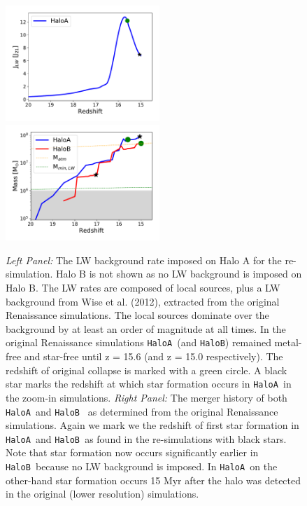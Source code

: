\documentclass[graphics, twocolumn, usenatbib]{mn2e}
\newcommand{\ha} {\texttt{HaloA~}}
\newcommand{\hb} {\texttt{HaloB~}}
\begin{document}
\begin{figure}
\centering
\begin{minipage}{175mm}      \begin{center} 
\centerline{
\includegraphics[width=0.52\textwidth]{FIGURES/Combined.pdf}
\includegraphics[width=0.52\textwidth]{FIGURES/MassRedshift.pdf}}
\caption{\textit{Left Panel:} The LW background rate imposed on Halo A for the re-simulation. Halo B is not shown
  as no LW background is imposed on Halo B. The LW rates
  are composed of local sources, plus a LW background from Wise et al. (2012), extracted from the original
  Renaissance simulations. The local sources dominate over the background by at least an order of magnitude at
  all times. In the original
  Renaissance simulations \ha (and \texttt{HaloB})  remained metal-free and star-free until z = 15.6 (and
  z = 15.0 respectively). The redshift of original collapse is marked with a green circle.
  A black star marks the redshift at which star formation occurs in \ha in the zoom-in simulations.
  \textit{Right Panel:} The merger history of both \ha and \hb
  as determined from the original Renaissance simulations. Again we mark we the redshift of first star formation
  in \ha and \hb as found in the re-simulations with black stars. Note that star formation now occurs significantly
  earlier in \hb because no LW background is imposed. In \ha on the other-hand star formation occurs 15 Myr after
  the halo was detected in the original (lower resolution) simulations. 
  }  \label{Fig:LWHistory}
\end{center} \end{minipage}

\end{figure}
\end{document}
